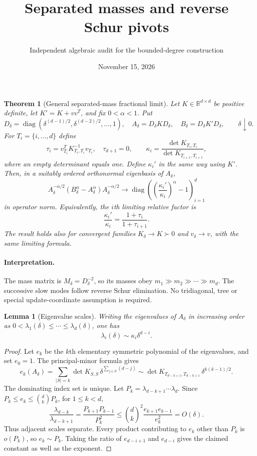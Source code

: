 \documentclass[11pt]{article}
\title{Separated masses and reverse Schur pivots}
\author{Independent algebraic audit for the bounded-degree construction}
\date{November 15, 2026}
\newtheorem{theorem}{Theorem}
\newtheorem{lemma}{Lemma}
\newcommand{\diag}{\operatorname{diag}}
\begin{document}
\maketitle

\begin{theorem}[General separated-mass fractional limit]\label{thm:main}
Let $K\in\mathbb R^{d\times d}$ be positive definite, let
$K'=K+vv^T$, and fix $0<\alpha<1$. Put
\[
 D_\delta=\diag(\delta^{(d-1)/2},\delta^{(d-2)/2},\ldots,1),\quad
 A_\delta=D_\delta K D_\delta,\quad
 B_\delta=D_\delta K'D_\delta,\qquad\delta\downarrow0.
\]
For $T_i=\{i,\ldots,d\}$ define
\[
 \tau_i=v_{T_i}^T K_{T_i,T_i}^{-1}v_{T_i},\quad
 \tau_{d+1}=0,\qquad
 \kappa_i=\frac{\det K_{T_i,T_i}}{\det K_{T_{i+1},T_{i+1}}},
\]
where an empty determinant equals one. Define $\kappa_i'$ in the same
way using $K'$. Then, in a suitably ordered orthonormal eigenbasis of
$A_\delta$,
\[
 A_\delta^{-\alpha/2}(B_\delta^\alpha-A_\delta^\alpha)
                 A_\delta^{-\alpha/2}
 \longrightarrow
 \diag\left(\left(\frac{\kappa_i'}{\kappa_i}\right)^\alpha-1\right)_{i=1}^d
\]
in operator norm. Equivalently, the $i$th limiting relative factor is
\[
 \frac{\kappa_i'}{\kappa_i}
          =\frac{1+\tau_i}{1+\tau_{i+1}}.
\]
The result holds also for convergent families $K_\delta\to K\succ0$
and $v_\delta\to v$, with the same limiting formula.
\end{theorem}

\paragraph{Interpretation.}
The mass matrix is $M_\delta=D_\delta^{-2}$, so its masses obey
$m_1\gg m_2\gg\cdots\gg m_d$. The successive slow modes follow reverse
Schur elimination. No tridiagonal, tree or special update-coordinate
assumption is required.

\begin{lemma}[Eigenvalue scales]\label{lem:scales}
Writing the eigenvalues of $A_\delta$ in increasing order as
$0<\lambda_1(\delta)\le\cdots\le\lambda_d(\delta)$, one has
\[
 \lambda_i(\delta)\sim\kappa_i\delta^{d-i}.
\]
\end{lemma}
\begin{proof}
Let $e_k$ be the $k$th elementary symmetric polynomial of the
eigenvalues, and set $e_0=1$. The principal-minor formula gives
\[
 e_k(A_\delta)
   =\sum_{|S|=k}\det K_{S,S}\,\delta^{\sum_{j\in S}(d-j)}
   \sim\det K_{T_{d-k+1},T_{d-k+1}}\,\delta^{k(k-1)/2}.
\]
The dominating index set is unique. Let
$P_k=\lambda_{d-k+1}\cdots\lambda_d$.
Since $P_k\le e_k\le \binom dk P_k$, for $1\le k<d$,
\[
 \frac{\lambda_{d-k}}{\lambda_{d-k+1}}
  =\frac{P_{k+1}P_{k-1}}{P_k^2}
  \le \binom dk^2\frac{e_{k+1}e_{k-1}}{e_k^2}
  =O(\delta).
\]
Thus adjacent scales separate. Every product contributing to $e_k$
other than $P_k$ is $o(P_k)$, so $e_k\sim P_k$.
Taking the ratio of $e_{d-i+1}$ and $e_{d-i}$ gives the claimed
constant as well as the exponent.
\end{proof}
\end{document}
